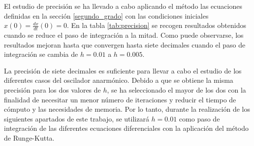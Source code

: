 \documentclass[11pt]{article}
\begin{document}
El estudio de precisión se ha llevado a cabo aplicando el método las ecuaciones
definidas en la sección \ref{segundo_grado} con las condiciones iniciales
$x(0) = \frac{dx}{dt}(0) = 0$. En la tabla \ref{tab:precision} se recogen
resultados obtenidos cuando se reduce el paso de integración a la mitad. Como
puede observarse, los resultados mejoran hasta que convergen hasta siete
decimales cuando el paso de integración se cambia de $h = 0.01$ a $h=0.005$.

La precisión de siete decimales es suficiente para llevar a cabo el estudio de
los diferentes casos del oscilador anarmónico. Debido a que se obtiene la misma
precisión para los dos valores de $h$, se ha seleccionado el mayor de los dos
con la finalidad de necesitar un menor número de iteraciones y reducir el tiempo
de cómputo y las necesidades de memoria. Por lo tanto, durante la realización de
los siguientes apartados de este trabajo, se utilizará $h = 0.01$ como paso de
integración de las diferentes ecuaciones diferenciales con la aplicación del
método de Runge-Kutta.  
\end{document}
